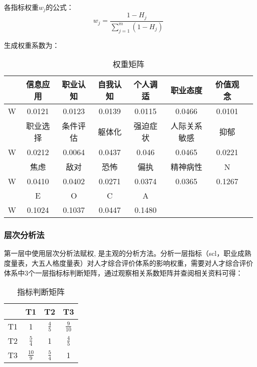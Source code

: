 \documentclass[withoutpreface,bwprint]{cumcmthesis} %
\begin{document}
各指标权重$w_j$的公式：
\begin{equation}
    w_j = \frac{1 - H_j}{\sum_{j=1}^{m} (1 - H_j)}
\end{equation}


  
生成权重系数为：

\begin{table}[h]
    \centering
    \begin{tabular}{cccccccc}
        \toprule
        & 信息应用 & 职业认知 & 自我认知 & 个人调适 & 职业态度 & 价值观念 \\ \midrule
        W & 0.0121 & 0.0123 & 0.0139 & 0.0115 & 0.0466 & 0.0101 \\ \midrule
        & 职业选择 & 条件评估 & 躯体化 & 强迫症状 & 人际关系敏感 & 抑郁 \\ \midrule
        W & 0.0212 & 0.0064 & 0.0437 & 0.046 & 0.0465 & 0.0221 \\ \midrule
        & 焦虑 & 敌对 & 恐怖 & 偏执 & 精神病性 & N \\ \midrule
        W & 0.0410 & 0.0402 & 0.0271 & 0.0374 & 0.0365 & 0.1267 \\ \midrule
        & E  & O & C & A \\ \midrule
        W & 0.1024 & 0.1037 & 0.0447 & 0.1480 \\ \bottomrule
    \end{tabular}
    \caption{权重矩阵}
    \label{tab:weights}
\end{table}

\subsubsection{层次分析法}

第一层中使用层次分析法赋权, 是主观的分析方法。分析一层指标（scl，职业成熟度量表，大五人格度量表）对人才综合评价体系的影响权重，需要对人才综合评价体系中3个一层指标标判断矩阵，通过观察相关系数矩阵并查阅相关资料\cite{AHP1}\cite{AHP2}\cite{AHP3}可得：

\begin{table}[h]
    \centering
    \begin{tabular}{cccc}
        \toprule
        & T1 & T2 & T3 \\ \midrule
        T1 & 1 & \(\frac{4}{5}\) & \(\frac{9}{10}\) \\
        T2 & \(\frac{5}{4}\) & 1 & \(\frac{4}{5}\) \\
        T3 & \(\frac{10}{9}\) & \(\frac{5}{4}\) & 1 \\ \bottomrule
    \end{tabular}
    \caption{指标判断矩阵}
    \label{tab:index judgment matrix}
    \end{table}
        
\end{document}
